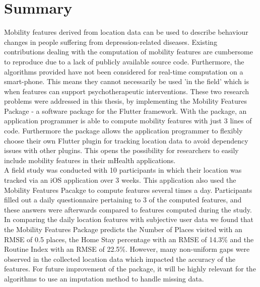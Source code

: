 \chapter{Summary}
Mobility features derived from location data can be used to describe behaviour changes in people suffering from depression-related diseases. Existing contributions dealing with the computation of mobility features are cumbersome to reproduce due to a lack of publicly available source code. Furthermore, the algorithms provided have not been considered for real-time computation on a smart-phone. This means they cannot necessarily be used 'in the field' which is when features can support psychotherapeutic interventions. These two research problems were addressed in this thesis, by implementing the Mobility Features Package - a software package for the Flutter framework. With the package, an application programmer is able to compute mobility features with just 3 lines of code. Furthermore the package allows the application programmer to flexibly choose their own Flutter plugin for tracking location data to avoid dependency issues with other plugins. This opens the possibility for researchers to easily include mobility features in their mHealth applications.\\

A field study was conducted with 10 participants in which their location was tracked via an iOS application over 3 weeks. This application also used the Mobility Features Pacakge to compute features several times a day. Participants filled out a daily questionnaire pertaining to 3 of the computed features, and these answers were afterwards compared to features computed during the study. In comparing the daily location features with subjective user data we found that the Mobility Features Package predicts the Number of Places visited with an RMSE of 0.5 places, the Home Stay percentage with an RMSE of 14.3\% and the Routine Index with an RMSE of 22.5\%. However, many non-uniform gaps were observed in the collected location data which impacted the accuracy of the features. For future improvement of the package, it will be highly relevant for the algorithms to use an imputation method to handle missing data.
